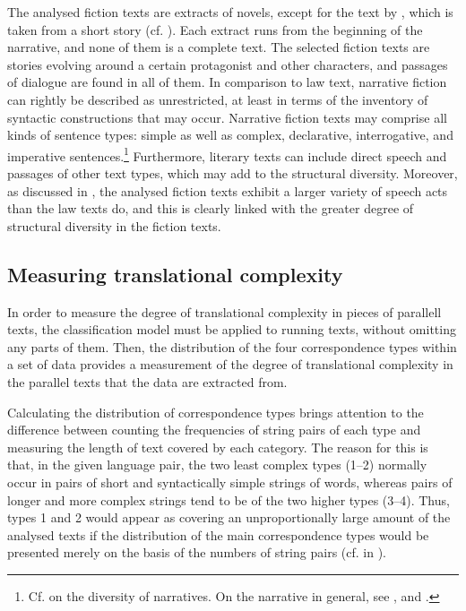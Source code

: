\documentclass[output=paper]{LSP/langsci}
\begin{document}
The analysed fiction texts are extracts of novels, except for the text by \citet{Vik1979}, which is taken from a short story (cf. ). Each extract runs from the beginning of the narrative, and none of them is a complete text. The selected fiction texts are stories evolving around a certain protagonist and other characters, and passages of dialogue are found in all of them. In comparison to law text, narrative fiction can rightly be described as unrestricted, at least in terms of the inventory of syntactic constructions that may occur. Narrative fiction texts may comprise all kinds of sentence types: simple as well as complex, declarative, interrogative, and imperative sentences.\footnote{Cf. \citet[185--189]{Ochs1997} on the diversity of narratives. On the narrative in general, see \citet{Abbott2002}, and \citet{Toolan2001}.} Furthermore, literary texts can include direct speech and passages of other text types, which may add to the structural diversity. Moreover, as discussed in \citet[283--284]{Thunes2011}, the analysed fiction texts exhibit a larger variety of speech acts than the law texts do, and this is clearly linked with the greater degree of structural diversity in the fiction texts.


\subsection{Measuring translational complexity}\label{sec:thunes:4.3}

In order to measure the degree of translational complexity in pieces of parallell texts, the classification model must be applied to running texts, without omitting any parts of them. Then, the distribution of the four correspondence types within a set of data provides a measurement of the degree of translational complexity in the parallel texts that the data are extracted from. 
 
Calculating the distribution of correspondence types brings attention to the difference between counting the frequencies of string pairs of each type and measuring the length of text covered by each category. The reason for this is that, in the given language pair, the two least complex types (1--2) normally occur in pairs of short and syntactically simple strings of words, whereas pairs of longer and more complex strings tend to be of the two higher types (3--4). Thus, types 1 and 2 would appear as covering an unproportionally large amount of the analysed texts if the distribution of the main correspondence types would be presented merely on the basis of the numbers of string pairs (cf.  in ).
\end{document}
